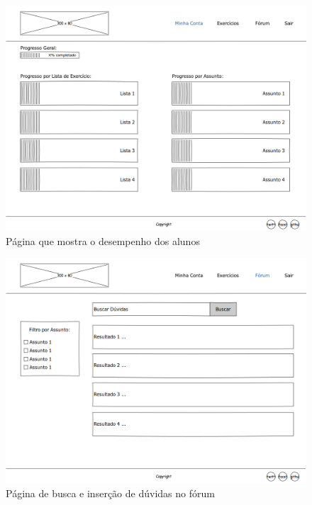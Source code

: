 \documentclass[graduacao,brazil]{ThesisPUC}
\begin{document}
\begin{figure}[H]
    \centering
    \includegraphics[width=\linewidth]{Imagens/BoardPage.png}
    \caption{P\'{a}gina que mostra o desempenho dos alunos}
\end{figure}

\begin{figure}[H]
    \centering
    \includegraphics[width=\linewidth]{Imagens/ForumPage.png}
    \caption{P\'{a}gina de busca e inser\c{c}\~{a}o de d\'{u}vidas no f\'{o}rum}
\end{figure}
\end{document}
